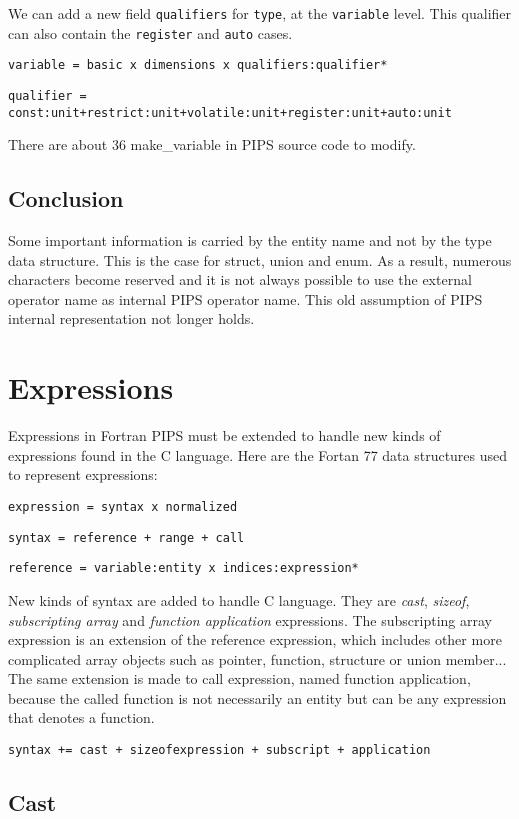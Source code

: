 \documentclass[a4paper]{report}
\begin{document}
We can add a new field \verb/qualifiers/ for \verb/type/, at the
 \verb/variable/ level. This qualifier can also contain the
 \verb/register/ and \verb/auto/ cases.

\verb/variable = basic x dimensions x qualifiers:qualifier*/

\verb/qualifier = const:unit+restrict:unit+volatile:unit+register:unit+auto:unit/

There are about 36 make\_variable in PIPS source code to modify.

\section{Conclusion}

Some important information is carried by the entity name and not by
 the type data structure. This is the case for struct, union and
 enum. As a result, numerous characters become reserved and it is not
 always possible to use the external operator name as internal PIPS
 operator name. This old assumption of PIPS internal representation
 not longer holds.

\chapter{Expressions}
\label{chapter:expressions}

Expressions in Fortran PIPS must be extended to handle new kinds of
expressions found in the C language. Here are the Fortan 77 data structures used to represent expressions:

\verb/expression = syntax x normalized/

\verb/syntax = reference + range + call/

\verb/reference = variable:entity x indices:expression*/

New kinds of syntax are added to handle C language. They are {\it cast},
 {\it sizeof}, {\it subscripting array} and
{\it function application} expressions. The subscripting array expression
is an extension of the reference expression, which includes other
more complicated array objects such as pointer, function,
structure or union member... The same extension is made to call
expression, named function application, because the called function is
not necessarily an entity but can be any expression that denotes a function.

\verb/syntax += cast + sizeofexpression + subscript + application/

\section{Cast}
\end{document}
